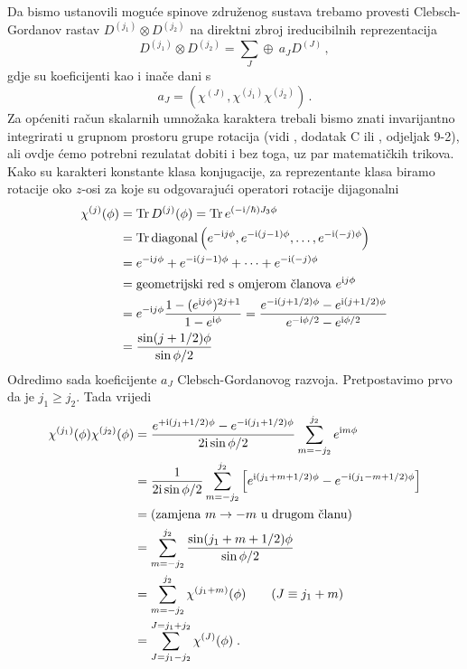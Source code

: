 Da bismo ustanovili moguće spinove združenog sustava trebamo
provesti Clebsch-Gordanov rastav $D^{(j_1)}\otimes D^{(j_2)}$ na direktni
zbroj ireducibilnih reprezentacija
\begin{displaymath}
  D^{(j_1)}\otimes D^{(j_2)} =
  \sum_J \oplus\: a_{J}D^{(J)} \,,
\end{displaymath}
gdje su koeficijenti kao i inače dani s
\begin{displaymath}
a_J = \left( \chi^{(J)}, \chi^{(j_1)} \chi^{(j_2)} \right) \,.
\end{displaymath}
Za općeniti račun skalarnih umnožaka karaktera trebali bismo
znati invarijantno integrirati u grupnom prostoru grupe rotacija (vidi \cite{Jones:1998},
dodatak C ili \cite{Hamermesh:1989}, odjeljak 9-2), ali ovdje ćemo potrebni rezulatat
dobiti i bez toga, uz par matematičkih trikova.
Kako su karakteri konstante klasa konjugacije, za reprezentante 
klasa biramo rotacije oko $z$-osi za koje su odgovarajući operatori
rotacije dijagonalni
\begin{equation}
\begin{split}
 \chi^{(j)}(\phi) &= \operatorname{Tr} D^{(j)}(\phi) = \operatorname{Tr} e^{(-\textrm{i}/\hbar)J_3 \phi} \\
 &= \operatorname{Tr} \textrm{diagonal}\left( e^{-\textrm{i} j\phi }, e^{-\textrm{i} (j-1)\phi}, \ldots,
e^{-\textrm{i}(-j)\phi}\right)\\
&= e^{-\textrm{i} j\phi } + e^{-\textrm{i} (j-1)\phi} + \cdots + e^{-\textrm{i}(-j)\phi}\\
&= \text{geometrijski red s omjerom članova $e^{\textrm{i} j\phi}$} \\
&= e^{-\textrm{i} j\phi} \frac{1- (e^{\textrm{i} j\phi})^{2j+1}}{1-e^{\textrm{i}\phi}}
= \frac{e^{-\textrm{i}(j+1/2)\phi} - e^{\textrm{i}(j+1/2)\phi}}{e^{-\textrm{i}\phi/2}-e^{\textrm{i}\phi/2}}\\
&= \frac{\sin(j+1/2)\phi}{\sin\phi/2}
\end{split}
\end{equation}
Odredimo sada koeficijente $a_J$ Clebsch-Gordanovog razvoja. Pretpostavimo
prvo da je $j_1 \ge j_2$. Tada vrijedi
\begin{equation}
\begin{split}
\chi^{(j_1)}(\phi)\chi^{(j_2)}(\phi)&=
 \frac{e^{+\textrm{i}(j_1+1/2)\phi} - e^{-\textrm{i}(j_1+1/2)\phi}}{2\textrm{i}\sin\phi/2}
\sum_{m=-j_2}^{j_2}e^{\textrm{i} m \phi}\\
&= \frac{1}{2 \textrm{i} \sin\phi/2} \sum_{m=-j_2}^{j_2}
\left[ e^{\textrm{i}(j_1+m+1/2)\phi} - e^{-\textrm{i}(j_1-m+1/2)\phi}\right]\\
&= (\text{zamjena $m\to -m$ u drugom članu}) \\
&=\sum_{m=-j_2}^{j_2} \frac{\sin(j_1+m+1/2)\phi}{\sin\phi/2}\\
&=\sum_{m=-j_2}^{j_2} \chi^{(j_1 + m)}(\phi) \qquad (J\equiv j_1 +m) \\
&=\sum_{J=j_1-j_2}^{J=j_1+j_2} \chi^{(J)}(\phi) \;.
\end{split}
\end{equation}
